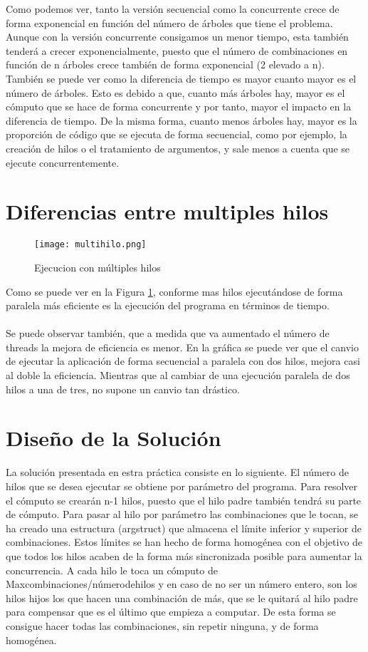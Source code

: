 \documentclass{article}
\begin{document}
Como podemos ver, tanto la versión secuencial como la concurrente 
crece de forma exponencial en función del número de árboles que tiene el problema.
Aunque con la versión concurrente consigamos un menor tiempo, esta también 
tenderá a crecer exponencialmente, puesto que el número de combinaciones
en función de n árboles crece también de forma exponencial (2 elevado a n).\\

También se puede ver como la diferencia de tiempo es mayor cuanto mayor es
el número de árboles. Esto es debido a que, cuanto más árboles hay, mayor es
el cómputo que se hace de forma concurrente y por tanto, mayor el impacto en
la diferencia de tiempo. De la misma forma, cuanto menos árboles hay, mayor es 
la proporción de código que se ejecuta de forma secuencial, como por ejemplo,
la creación de hilos o el tratamiento de argumentos, y sale menos a cuenta 
que se ejecute concurrentemente.

\section{Diferencias entre multiples hilos}
\begin{figure}[hbt!]
  \texttt{[image: multihilo.png]}
  \caption{Ejecucion con múltiples hilos}
  \label{fig:multhilos}
\end{figure}

Como se puede ver en la Figura \ref{fig:multhilos}, conforme mas hilos ejecutándose de forma paralela más eficiente es la ejecución del programa en términos de tiempo.
\\\\
Se puede observar también, que a medida que va aumentado el número de threads la mejora de eficiencia es menor. En la gráfica se puede ver que el canvio de ejecutar la aplicación de forma secuencial a paralela con dos hilos, mejora casi al doble la eficiencia. Mientras que al cambiar de una ejecución paralela de dos hilos a una de tres, no supone un canvio tan drástico.\\

\section{Diseño de la Solución}
La solución presentada en estra práctica consiste en lo siguiente.
El número de hilos que se desea ejecutar se obtiene por parámetro del
programa. Para resolver el cómputo se crearán n-1 hilos, puesto que
el hilo padre también tendrá su parte de cómputo.
Para pasar al hilo por parámetro las combinaciones que le tocan, se ha 
creado una estructura (argstruct) que almacena el límite inferior y 
superior de combinaciones. Estos límites se han hecho de forma homogénea
con el objetivo de que todos los hilos acaben de la forma más sincronizada
posible para aumentar la concurrencia. A cada hilo le toca un cómputo de 
Maxcombinaciones/númerodehilos y en caso de no ser un número entero, son
los hilos hijos los que hacen una combinación de más, que se le quitará al hilo
padre para compensar que es el último que empieza a computar. De esta forma
se consigue hacer todas las combinaciones, sin repetir ninguna, y de forma 
homogénea.
\end{document}
